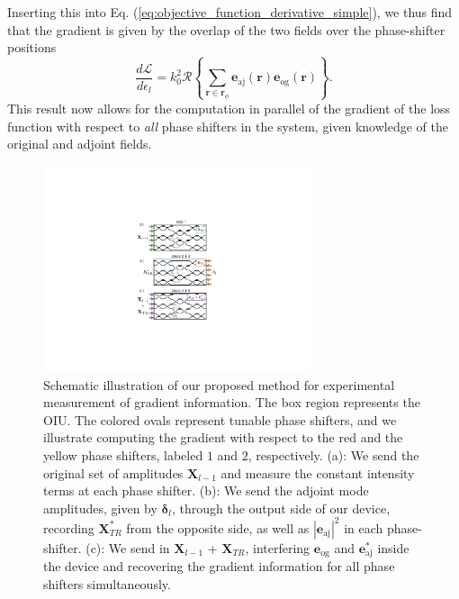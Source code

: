 Inserting this into Eq. (\ref{eq:objective_function_derivative_simple}), we thus find that the gradient is given by the overlap of the two fields over the phase-shifter positions
%
\begin{equation}
\frac{d\mathcal{L}}{d\epsilon_l} = k_0^2 \mathcal{R}\left\{ \sum_{\mathbf{r} \in \mathbf{r}_\phi} \mathbf{e}_{\textrm{aj}}(\mathbf{r}) \mathbf{e}_{\textrm{og}}(\mathbf{r}) \right\}.
\label{eq:sensitivity_sum}
\end{equation}
%
This result now allows for the computation in parallel of the gradient of the loss function with respect to \textit{all} phase shifters in the system, given knowledge of the original and adjoint fields.

\begin{figure}[ht!]
\includegraphics[width=0.7\textwidth]{figures/insitu_TR}
\caption{\label{fig:TR_schematic} Schematic illustration of our proposed method for experimental measurement of gradient information. The box region represents the OIU.  The colored ovals represent tunable phase shifters, and we illustrate computing the gradient with respect to the red and the yellow phase shifters, labeled $1$ and $2$, respectively. (a): We send the original set of amplitudes $\mathbf{X}_{l-1}$ and measure the constant intensity terms at each phase shifter. (b): We send the adjoint mode amplitudes, given by $\boldsymbol{\delta}_l$, through the output side of our device, recording $\mathbf{X}_{TR}^*$ from the opposite side, as well as $|\mathbf{e}_\textrm{aj}|^2$ in each phase-shifter. (c): We send in $\mathbf{X}_{l-1}$ + $\mathbf{X}_{TR}$, interfering $\mathbf{e}_{\textrm{og}}$ and $\mathbf{e}_\textrm{aj}^*$ inside the device and recovering the gradient information for all phase shifters simultaneously.}
\end{figure}

